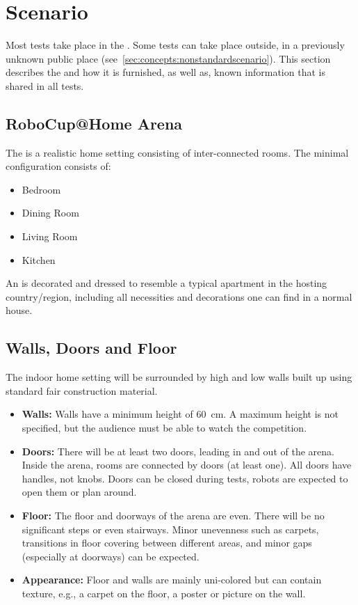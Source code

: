 \section{Scenario}
\label{sec:rules:scenario}
Most tests take place in the \RoboCup\AtHome{} \Arena{}. Some tests can take place outside, in a previously unknown public place (see~\ref{sec:concepts:nonstandardscenario}). This section describes the \Arena{} and how it is furnished,  as well as, known information that is shared in all tests. 

\subsection{RoboCup@Home Arena}
\label{sec:rules:scenario:arena}
The \RoboCup\AtHome{} \Arena{} is a realistic home setting consisting of inter-connected rooms.
The minimal configuration consists of:
\begin{itemize}
	\item Bedroom
	\item Dining Room
	\item Living Room
	\item Kitchen
\end{itemize}

An \Arena{} is decorated and dressed to resemble a typical apartment in the hosting country/region, including all necessities and decorations one can find in a normal house.

\subsection{Walls, Doors and Floor}
\label{sec:rules:scenario:walls}
The indoor home setting will be surrounded by high and low walls built up using standard fair construction material.

\begin{itemize}
	\item \textbf{Walls:} Walls have a minimum height of \SI{60}{\centi\meter}. A maximum height is not specified, but the audience must be able to watch the competition.

	\item \textbf{Doors:} There will be at least two doors, leading in and out of the arena.
	Inside the arena, rooms are connected by doors (at least one).
	All doors have handles, not knobs.
	Doors can be closed during tests, robots are expected to open them or plan around.

	\item \textbf{Floor:} The floor and doorways of the arena are even.
	There will be no significant steps or even stairways.
	Minor unevenness such as carpets, transitions in floor covering between different areas, and minor gaps (especially at doorways) can be expected.

	\item \textbf{Appearance:} Floor and walls are mainly uni-colored but can contain texture, e.g., a carpet on the floor, a poster or picture on the wall.\\
\end{itemize}


